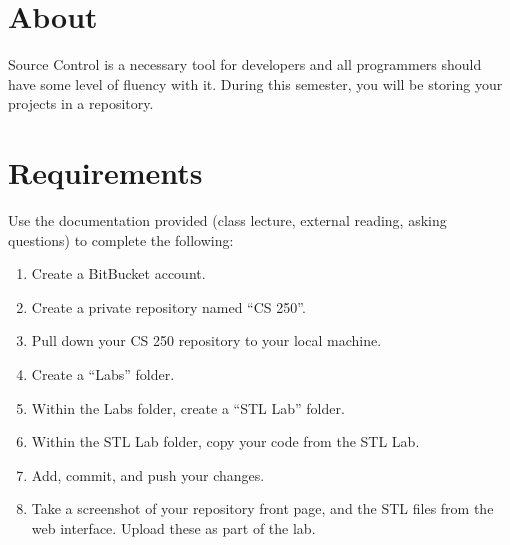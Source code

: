 
\newcommand{\laClass}       {CS 250}
\newcommand{\laSemester}    {Spring 2018}
\newcommand{\laChapter}     {}
\newcommand{\laType}        {Lab}
\newcommand{\laAssignment}  {}
\newcommand{\laPoints}      {5}
\newcommand{\laTitle}       {Git and Source Control}
\newcommand{\laStarterFiles}{Download from GitHub.}
\newcommand{\laTopics}      {Source Control and Git basics}
\setcounter{chapter}{1}
\setcounter{section}{1}
\addtocounter{section}{-1}
\toggletrue{answerkey}
\togglefalse{answerkey}



    \section{About}

    Source Control is a necessary tool for developers and all programmers should have
    some level of fluency with it. During this semester, you will be storing your projects
    in a repository.

    \section{Requirements}

    Use the documentation provided (class lecture, external reading, asking questions)
    to complete the following:

    \begin{enumerate}
        \item   Create a BitBucket account.
        \item   Create a private repository named ``CS 250''.
        \item   Pull down your CS 250 repository to your local machine.
        \item   Create a ``Labs'' folder.
        \item   Within the Labs folder, create a ``STL Lab'' folder.
        \item   Within the STL Lab folder, copy your code from the STL Lab.
        \item   Add, commit, and push your changes.
        \item   Take a screenshot of your repository front page, and the STL files from the web interface.
                Upload these as part of the lab.
    \end{enumerate}

    


